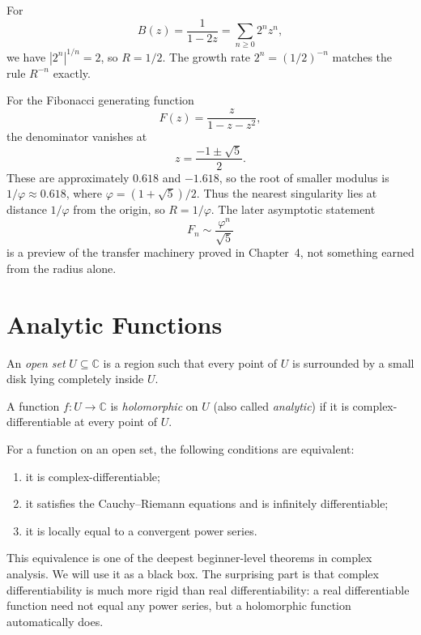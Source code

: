 \begin{example}
For
\[
  B(z) = \frac{1}{1-2z} = \sum_{n \ge 0} 2^n z^n,
\]
we have $|2^n|^{1/n}=2$, so $R=1/2$. The growth rate $2^n = (1/2)^{-n}$ matches the rule $R^{-n}$ exactly.

For the Fibonacci generating function
\[
  F(z) = \frac{z}{1-z-z^2},
\]
the denominator vanishes at
\[
  z = \frac{-1 \pm \sqrt{5}}{2}.
\]
These are approximately $0.618$ and $-1.618$, so the root of smaller modulus is $1/\varphi \approx 0.618$, where $\varphi=(1+\sqrt{5})/2$. Thus the nearest singularity lies at distance $1/\varphi$ from the origin, so $R=1/\varphi$. The later asymptotic statement
\[
  F_n \sim \frac{\varphi^n}{\sqrt{5}}
\]
is a preview of the transfer machinery proved in Chapter~4, not something earned from the radius alone.
\end{example}

\section{Analytic Functions}

\begin{definition}
An \emph{open set} $U \subseteq \mathbb{C}$ is a region such that every point of $U$ is surrounded by a small disk lying completely inside $U$.
\end{definition}

\begin{definition}
A function $f:U \to \mathbb{C}$ is \emph{holomorphic} on $U$ (also called \emph{analytic}) if it is complex-differentiable at every point of $U$.
\end{definition}

\begin{theorem}
For a function on an open set, the following conditions are equivalent:
\begin{enumerate}
\item it is complex-differentiable;
\item it satisfies the Cauchy--Riemann equations and is infinitely differentiable;
\item it is locally equal to a convergent power series.
\end{enumerate}
\end{theorem}

This equivalence is one of the deepest beginner-level theorems in complex analysis. We will use it as a black box. The surprising part is that complex differentiability is much more rigid than real differentiability: a real differentiable function need not equal any power series, but a holomorphic function automatically does.

